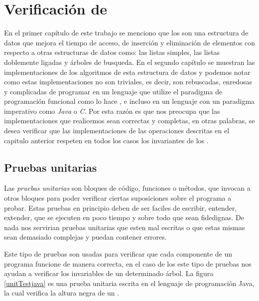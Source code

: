 \chapter{Verificación de {\arns}}

En el primer cap\'itulo de este trabajo se menciono que los {\arns} son una estructura de datos
que mejora el tiempo de acceso, de inserción y eliminación de elementos con respecto a otras
estructuras de datos como: las listas simples, las listas doblemente ligadas y \'arboles de
busqueda. En el segundo cap\'itulo se muestran las implementaciones de los algoritmos de esta
estructura de datos y podemos notar como estas implementaciones no son triviales, es decir, son
rebuscadas, enredosas y complicadas de programar en un lenguaje que utilize el paradigma de programaci\'on funcional como
lo hace {\coq}, e incluso en un lenguaje con un paradigma imperativo como \textit{Java} o \textit{C}.
Por esta razón es que nos preocupa que las implementaciones que realicemos sean correctas y
completas, en otras palabras, se desea verificar que las implementaciones de las operaciones
descritas en el capitulo anterior respeten en todos los casos los invariantes de los {\arns}.

\section{Pruebas unitarias}
Las \textit{pruebas unitarias} \cite{unittest} son bloques de c\'odigo, funciones o m\'etodos, que
invocan a otros bloques para poder verificar ciertas suposiciones sobre el programa a probar. Estas
pruebas en principio deben de ser faciles de escribir, entender, extender, que se ejecuten en poco
tiempo y sobre todo que sean fidedignas. De nada nos servirian pruebas unitarias que esten mal
escritas o que estas mismas sean demasiado complejas y puedan contener errores.

Este tipo de pruebas son usadas para verificar que cada componente de un programa funcione de
manera correcta, en el caso de los {\arns} este tipo de pruebas nos ayudan a verificar los
invariables de un determinado \'arbol. La figura \ref{unitTestjava} es una prueba unitaria
escrita en el lenguaje de programaci\'on Java, la cual verifica la altura negra de un {\arn}.

